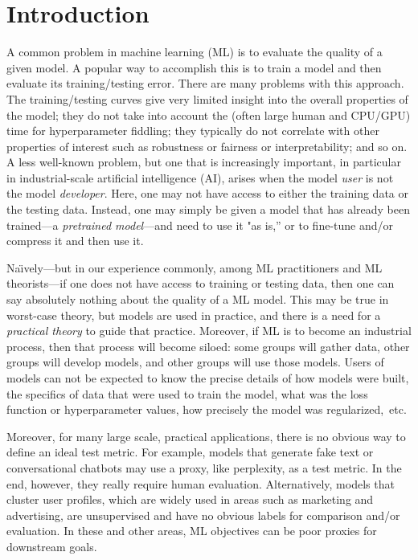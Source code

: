 
\section{Introduction}
\label{sxn:intro}

A common problem in machine learning (ML) 
is to evaluate the quality of a given model.
A popular way to accomplish this
is to train a model and then evaluate its training/testing error.
There are many problems with this approach.
The training/testing curves give very limited insight into the overall properties of the model; 
they do not take into account the (often large human and CPU/GPU) time for hyperparameter fiddling;
they typically do not correlate with other properties of interest such as robustness or fairness or interpretability; 
and so on.
A less well-known problem, but one that is increasingly important, in particular in industrial-scale artificial intelligence (AI), arises when the model \emph{user} is not the model \emph{developer}.
Here, one may not have access to either the training data or the testing data.
Instead, one may simply be given a model that has already been trained---a \emph{pretrained model}---and need to use it "as is,'' or to fine-tune and/or compress it and then use it.

Na\"{\i}vely---but in our experience commonly, among ML practitioners and ML theorists---if one does not have access to training or testing data, then one can say absolutely nothing about the quality of a ML model.
This may be true in worst-case theory, but models are used in practice, and there is a need for a \emph{practical theory} to guide that practice.
Moreover, if ML is to become an industrial process, then that process will become siloed: some groups will gather data, other groups will develop models, and other groups will use those models.
Users of models can not be expected to know the precise details of how models were built, the specifics of data that were used to train the model, what was the loss function or hyperparameter values, how precisely the model was regularized,~etc.

Moreover, for many large scale, practical applications, there is no obvious way to define an ideal test metric. 
For example, models that generate fake text or conversational chatbots may use a proxy, like perplexity, as a test metric.
In the end, however, they really require human evaluation. 
Alternatively, models that cluster user profiles, which are widely used in areas such as marketing and advertising, are unsupervised and have no obvious labels for comparison and/or evaluation.
In these and other areas, ML objectives can be poor proxies for downstream goals.

